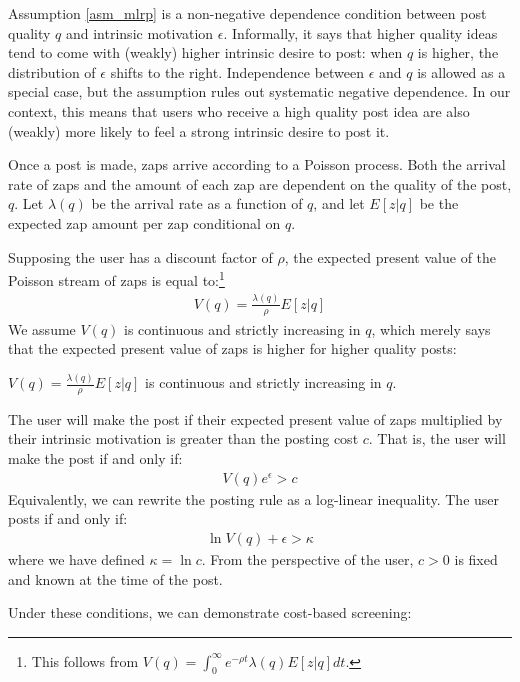 Assumption \ref{asm_mlrp} is a non-negative dependence condition between post quality $q$ and intrinsic motivation $\epsilon$. Informally, it says that higher quality ideas tend to come with (weakly) higher intrinsic desire to post: when $q$ is higher, the distribution of $\epsilon$ shifts to the right. Independence between $\epsilon$ and $q$ is allowed as a special case, but the assumption rules out systematic negative dependence. In our context, this means that users who receive a high quality post idea are also (weakly) more likely to feel a strong intrinsic desire to post it.

Once a post is made, zaps arrive according to a Poisson process. Both the arrival rate of zaps and the amount of each zap are dependent on the quality of the post, $q$. Let $\lambda(q)$ be the arrival rate as a function of $q$, and let $E[z|q]$ be the expected zap amount per zap conditional on $q$.

Supposing the user has a discount factor of $\rho$, the expected present value of the Poisson stream of zaps is equal to:\footnote{This follows from $V(q) = \int_{0}^{\infty} e^{-\rho t} \lambda(q) E[z|q] dt$.}
\begin{align}
V(q) = \frac{\lambda(q)}{\rho} E \left[ z | q \right] \label{eq_V}
\end{align}
We assume $V(q)$ is continuous and strictly increasing in $q$, which merely says that the expected present value of zaps is higher for higher quality posts:
\begin{assumption}\label{asm_monotonicity}
$V(q) = \frac{\lambda(q)}{\rho} E[z|q]$ is continuous and strictly increasing in $q$.
\end{assumption}

The user will make the post if their expected present value of zaps multiplied by their intrinsic motivation is greater than the posting cost $c$. That is, the user will make the post if and only if:
\begin{align}
V(q)e^{\epsilon} > c
\end{align}
Equivalently, we can rewrite the posting rule as a log-linear inequality. The user posts if and only if:
\begin{align}
\ln V(q) + \epsilon > \kappa \label{eq_pay_to_post_choice}
\end{align}
where we have defined $\kappa = \ln c$. From the perspective of the user, $c > 0$ is fixed and known at the time of the post.

Under these conditions, we can demonstrate cost-based screening:

